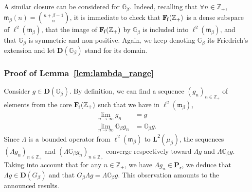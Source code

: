 \documentclass[AHL,Unicode,longabstracts]{cedram}
\newcommand{\ZZ}{\mathbb{Z}}
\newcommand{\fe}{\mathfrak{e}}
\newcommand{\fm}{\mathfrak{m}}
\newcommand{\iy}{\infty}
\newcommand{\ri}{\rightarrow}
\newcommand{\dBg}{{\discret{G}}}
\newcommand{\Bg}{G}
\newcommand{\esP}{\mathbf{P}}
\newcommand{\esD}{\mathbf{D}}
\newcommand{\esL}{\mathbf{L}}
\newcommand{\esLd}{\ell}
\newcommand{\esF}{\mathbf{F}}
\newcommand{\esPe}{\esP_{\! \fe}}
\newcommand{\esFf}{\esF_{\hskip-.3mm\mathrm{f}}}
\newcommand{\discret}[1]{\mathds{#1}}
\let\oldforall\forall
\renewcommand*{\forall}{\mathrel{\oldforall}}
\begin{document}
A similar closure can be considered for $\dBg_{\beta}$. Indeed, recalling that $
\forall n\in\ZZ_+$, $\fm_{\beta}(n)=\binom{n+\beta-1}{n}$, it is immediate to check that $\esFf(\ZZ_+)$ is a dense subspace of $\esLd^2(\fm_{\beta})$, that the image of $\esFf(\ZZ_+)$ by $\dBg_{\beta}$ is included into $\esLd^2(\fm_{\beta})$, and that $\dBg_{\beta}$ is symmetric and non-positive. Again, we keep denoting $\dBg_{\beta}$ its Friedrich's extension and let $\esD(\dBg_{\beta})$ stand for its domain.

\subsubsection{Proof of Lemma~\ref{lem:lambda_range}}

Consider $g\in\esD(\dBg_{\beta})$. By definition, we can find a sequence $(g_n)_{n\in\ZZ_+}$ of elements from the core $\esFf(\ZZ_+)$ such that we have in $\esLd^2(\fm_{\beta})$,
\begin{align*}
\lim_{n\ri\iy} g_n&=g\\
\lim_{n\ri\iy} \dBg_{\beta} g_n &=\dBg_{\beta} g.
\end{align*}
Since $\Lambda$ is a bounded operator from $\esLd^2(\fm_{\beta})$ to $\esL^2(\mu_{\beta})$, the sequences $(\Lambda g_n)_{n\in\ZZ_+}$ and $(\Lambda \dBg_{\beta} g_n)_{n\in\ZZ_+}$ converge respectively toward $\Lambda g $ and $\Lambda \dBg_{\beta} g $. Taking into account that for any $n\in\ZZ_+$, we have $\Lambda g_{n} \in\esPe$, we deduce that $\Lambda g\in\esD(\Bg_{\beta})$ and that $\Bg_{\beta}\Lambda g=\Lambda \dBg_{\beta} g$. This observation amounts to the announced results.
\end{document}

